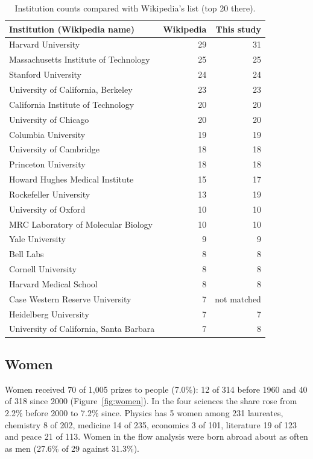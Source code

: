 \documentclass[11pt,a4paper]{article}
\begin{document}
\begin{table}[tbp]\centering\small\caption{Institution counts compared with Wikipedia's list (top 20 there).}\label{tab:wiki}\begin{tabular}{lrr}\toprule Institution (Wikipedia name) & Wikipedia & This study\\\midrule
Harvard University & 29 & 31\\
Massachusetts Institute of Technology & 25 & 25\\
Stanford University & 24 & 24\\
University of California, Berkeley & 23 & 23\\
California Institute of Technology & 20 & 20\\
University of Chicago & 20 & 20\\
Columbia University & 19 & 19\\
University of Cambridge & 18 & 18\\
Princeton University & 18 & 18\\
Howard Hughes Medical Institute & 15 & 17\\
Rockefeller University & 13 & 19\\
University of Oxford & 10 & 10\\
MRC Laboratory of Molecular Biology & 10 & 10\\
Yale University & 9 & 9\\
Bell Labs & 8 & 8\\
Cornell University & 8 & 8\\
Harvard Medical School & 8 & 8\\
Case Western Reserve University & 7 & not matched\\
Heidelberg University & 7 & 7\\
University of California, Santa Barbara & 7 & 8\\
\bottomrule\end{tabular}\end{table}

\subsection{Women}
Women received 70 of 1,005 prizes to people (7.0\%): 12 of 314 before 1960 and 40 of 318 since 2000 (Figure~\ref{fig:women}). In the four sciences the share rose from 2.2\% before 2000 to 7.2\% since. Physics has 5 women among 231 laureates, chemistry 8 of 202, medicine 14 of 235, economics 3 of 101, literature 19 of 123 and peace 21 of 113. Women in the flow analysis were born abroad about as often as men (27.6\% of 29 against 31.3\%).
\end{document}
